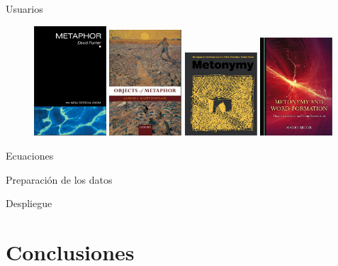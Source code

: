 \documentclass[presentation]{beamer}
\begin{document}
\begin{frame}[label={sec:org215656d}]{Usuarios}
  \begin{figure}
\includegraphics[width=0.24\textwidth]{./assets/negocio_metafora1.png}
\includegraphics[width=0.24\textwidth]{./assets/negocio_metafora2.png}
\includegraphics[width=0.24\textwidth]{./assets/negocio_metonimia1.png}
\includegraphics[width=0.24\textwidth]{./assets/negocio_metonimia2.png}
  \end{figure}
\end{frame}
\begin{frame}[label={sec:orga8c96b0}]{Ecuaciones}
\end{frame}
\begin{frame}[label={sec:org40e151a}]{Preparación de los datos}
\end{frame}
\begin{frame}[label={sec:org136279d}]{Despliegue}
\end{frame}


\section{Conclusiones}
\label{sec:org9321eac}


 
\end{document}
